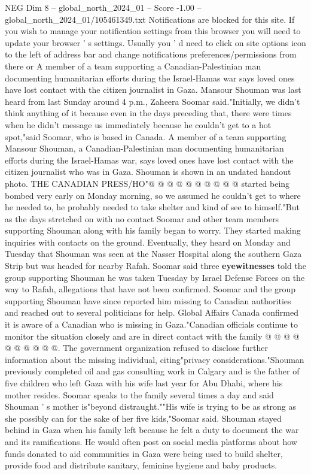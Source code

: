 \begin{textsample}{NEG Dim 8 – global\_north\_2024\_01 – Score -1.00 – global\_north\_2024\_01/105461349.txt}  \label{ex:f8_neg_276}
Notifications are blocked for this site.
If you wish to manage your notification settings from this browser you will need to update your browser ' s settings.
Usually you ' d need to click on site options icon to the left of address bar and change notifications preferences/permissions from there or A member of a team supporting a Canadian-Palestinian man documenting humanitarian efforts during the Israel-Hamas war says loved ones have lost contact with the citizen journalist in Gaza.
Mansour Shouman was last heard from last Sunday around 4 p.m., Zaheera Soomar said."Initially, we didn't think anything of it because even in the days preceding that, there were times when he didn't message us immediately because he couldn't get to a hot spot,"said Soomar, who is based in Canada.
A member of a team supporting Mansour Shouman, a Canadian-Palestinian man documenting humanitarian efforts during the Israel-Hamas war, says loved ones have lost contact with the citizen journalist who was in Gaza.
Shouman is shown in an undated handout photo.
THE CANADIAN PRESS/HO"@ @ @ @ @ @ @ @ @ @ started being bombed very early on Monday morning, so we assumed he couldn't get to where he needed to, he probably needed to take shelter and kind of see to himself."But as the days stretched on with no contact Soomar and other team members supporting Shouman along with his family began to worry.
They started making inquiries with contacts on the ground.
Eventually, they heard on Monday and Tuesday that Shouman was seen at the Nasser Hospital along the southern Gaza Strip but was headed for nearby Rafah.
Soomar said three \textbf{eyewitnesses} told the group supporting Shouman he was taken Tuesday by Israel Defense Forces on the way to Rafah, allegations that have not been confirmed.
Soomar and the group supporting Shouman have since reported him missing to Canadian authorities and reached out to several politicians for help.
Global Affairs Canada confirmed it is aware of a Canadian who is missing in Gaza."Canadian officials continue to monitor the situation closely and are in direct contact with the family @ @ @ @ @ @ @ @ @ @.
The government organization refused to disclose further information about the missing individual, citing"privacy considerations."Shouman previously completed oil and gas consulting work in Calgary and is the father of five children who left Gaza with his wife last year for Abu Dhabi, where his mother resides.
Soomar speaks to the family several times a day and said Shouman ' s mother is"beyond distraught.""His wife is trying to be as strong as she possibly can for the sake of her five kids,"Soomar said.
Shouman stayed behind in Gaza when his family left because he felt a duty to document the war and its ramifications.
He would often post on social media platforms about how funds donated to aid communities in Gaza were being used to build shelter, provide food and distribute sanitary, feminine hygiene and baby products.

\end{textsample}
